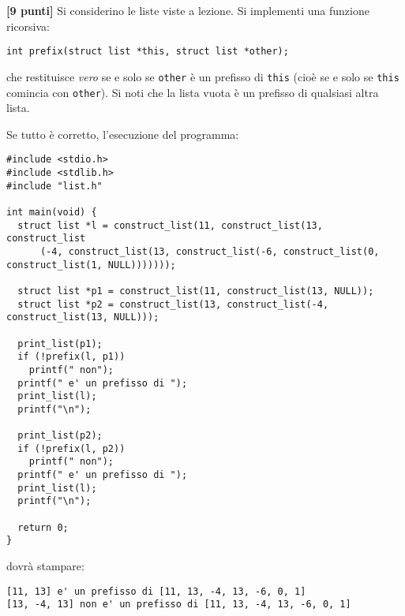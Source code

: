 \documentclass{article}[10pt]
\newcounter{esnu}
\newenvironment{esercizio}{\medskip \noindent {\bf Esercizio\addtocounter{esnu}{1} \arabic{esnu}}}{}
\begin{document}
\begin{esercizio}
\textbf{[9 punti]}
Si considerino le liste viste a lezione. Si implementi una funzione ricorsiva:
\begin{verbatim}
int prefix(struct list *this, struct list *other);
\end{verbatim}
che restituisce \emph{vero} se e solo se \texttt{other} \`e un prefisso di \texttt{this} (cio\`e se e solo se \texttt{this} comincia con \texttt{other}). Si noti che la lista
vuota \`e un prefisso di qualsiasi altra lista.

Se tutto \`e corretto, l'esecuzione del programma:

{\small
\begin{verbatim}
#include <stdio.h>
#include <stdlib.h>
#include "list.h"

int main(void) {
  struct list *l = construct_list(11, construct_list(13, construct_list
      (-4, construct_list(13, construct_list(-6, construct_list(0, construct_list(1, NULL)))))));

  struct list *p1 = construct_list(11, construct_list(13, NULL));
  struct list *p2 = construct_list(13, construct_list(-4, construct_list(13, NULL)));

  print_list(p1);
  if (!prefix(l, p1))
    printf(" non");
  printf(" e' un prefisso di ");
  print_list(l);
  printf("\n");

  print_list(p2);
  if (!prefix(l, p2))
    printf(" non");
  printf(" e' un prefisso di ");
  print_list(l);
  printf("\n");

  return 0;
}
\end{verbatim}
}

\noindent
dovr\`a stampare:

{\small
\begin{verbatim}
[11, 13] e' un prefisso di [11, 13, -4, 13, -6, 0, 1]
[13, -4, 13] non e' un prefisso di [11, 13, -4, 13, -6, 0, 1]
\end{verbatim}
}
%
\end{esercizio}
%
\end{document}
